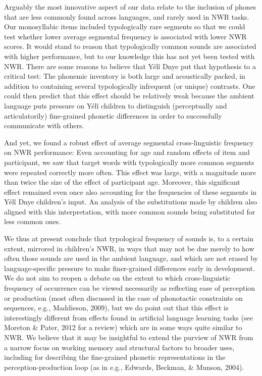 \documentclass[english,,man,floatsintext]{apa6}
\begin{document}
Arguably the most innovative aspect of our data relate to the inclusion of phones that are less commonly found across languages, and rarely used in NWR tasks. Our monosyllabic items included typologically rare segments so that we could test whether lower average segmental frequency is associated with lower NWR scores. It would stand to reason that typologically common sounds are associated with higher performance, but to our knowledge this has not yet been tested with NWR. There are some reasons to believe that Yélî Dnye put that hypothesis to a critical test: The phonemic inventory is both large and acoustically packed, in addition to containing several typologically infrequent (or unique) contrasts. One could then predict that this effect should be relatively weak because the ambient language puts pressure on Yélî children to distinguish (perceptually and articulatorily) fine-grained phonetic differences in order to successfully communicate with others.

And yet, we found a robust effect of average segmental cross-linguistic frequency on NWR performance: Even accounting for age and random effects of item and participant, we saw that target words with typologically more common segments were repeated correctly more often. This effect was large, with a magnitude more than twice the size of the effect of participant age. Moreover, this significant effect remained even once also accounting for the frequencies of these segments in Yélî Dnye children's input. An analysis of the substitutions made by children also aligned with this interpretation, with more common sounds being substituted for less common ones.

We thus at present conclude that typological frequency of sounds is, to a certain extent, mirrored in children's NWR, in ways that may not be due merely to how often those sounds are used in the ambient language, and which are not erased by language-specific pressure to make finer-grained differences early in development. We do not aim to reopen a debate on the extent to which cross-linguistic frequency of occurrence can be viewed necessarily as reflecting ease of perception or production (most often discussed in the case of phonotactic constraints on sequences, e.g., Maddieson, 2009), but we do point out that this effect is interestingly different from effects found in artificial language learning tasks (see Moreton \& Pater, 2012 for a review) which are in some ways quite similar to NWR. We believe that it may be insightful to extend the purview of NWR from a narrow focus on working memory and structural factors to broader uses, including for describing the fine-grained phonetic representations in the perception-production loop (as in e.g., Edwards, Beckman, \& Munson, 2004).
\end{document}
